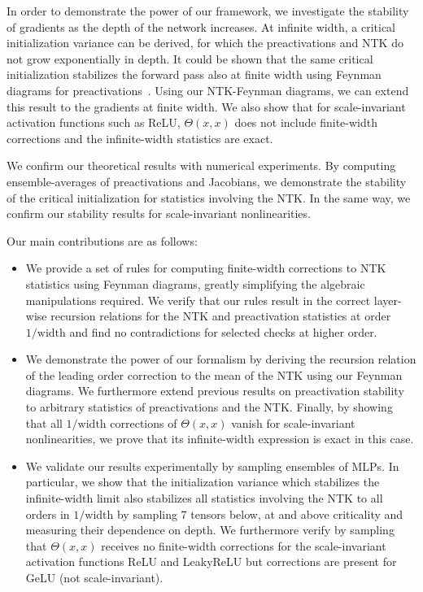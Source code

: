 In order to demonstrate the power of our framework, we investigate the stability of gradients as the depth of the network increases. At infinite width, a critical initialization variance can be derived, for which the preactivations and NTK do not grow exponentially in depth. It could be shown that the same critical initialization stabilizes the forward pass also at finite width using Feynman diagrams for preactivations~\cite{banta2024}. Using our NTK-Feynman diagrams, we can extend this result to the gradients at finite width. We also show that for scale-invariant activation functions such as ReLU, $\Theta(x,x)$ does not include finite-width corrections and the infinite-width statistics are exact.

We confirm our theoretical results with numerical experiments. By computing ensemble-averages of preactivations and Jacobians, we demonstrate the stability of the critical initialization for statistics involving the NTK. In the same way, we confirm our stability results for scale-invariant nonlinearities.

Our main contributions are as follows:
\begin{itemize}
\item We provide a set of rules for computing finite-width corrections to NTK statistics using Feynman diagrams, greatly simplifying the algebraic manipulations required. We verify that our rules result in the correct layer-wise recursion relations for the NTK and preactivation statistics at order $1/\text{width}$ and find no contradictions for selected checks at higher order.
\item We demonstrate the power of our formalism by deriving the recursion relation of the leading order correction to the mean of the NTK using our Feynman diagrams. We furthermore extend previous results on preactivation stability to arbitrary statistics of preactivations and the NTK. Finally, by showing that all $1/\text{width}$ corrections of $\Theta(x,x)$ vanish for scale-invariant nonlinearities, we prove that its infinite-width expression is exact in this case.
\item We validate our results experimentally by sampling ensembles of MLPs. In particular, we show that the initialization variance which stabilizes the infinite-width limit also stabilizes all statistics involving the NTK to all orders in $1/\text{width}$ by sampling 7 tensors below, at and above criticality and measuring their dependence on depth. We furthermore verify by sampling that $\Theta(x,x)$ receives no finite-width corrections for the scale-invariant activation functions ReLU and LeakyReLU but corrections are present for GeLU (not scale-invariant).
\end{itemize}

